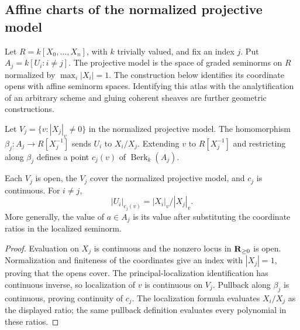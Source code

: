 \subsection{Affine charts of the normalized projective model}
\label{subsec:projective-charts}

Let $R=k[X_0,\ldots,X_n]$, with $k$ trivially valued, and fix an index $j$.
Put $A_j=k[U_i:i\ne j]$. The projective model is the space of graded
seminorms on $R$ normalized by $\max_i|X_i|=1$. The construction below
identifies its coordinate opens with affine seminorm spaces. Identifying this
atlas with the analytification of an arbitrary scheme and gluing coherent
sheaves are further geometric constructions.

\begin{definition}
\label{charts:ratio-map}
\leanok
{}
Let $V_j=\{v:|X_j|_v\ne0\}$ in the normalized projective model.
The homomorphism $\beta_j:A_j\to R[X_j^{-1}]$ sends $U_i$ to
$X_i/X_j$. Extending $v$ to $R[X_j^{-1}]$ and restricting along
$\beta_j$ defines a point $c_j(v)$ of $\operatorname{Berk}_k(A_j)$.
\end{definition}

\begin{lemma}
\label{charts:forward-chart}
\leanok
{}
Each $V_j$ is open, the $V_j$ cover the normalized projective model,
and $c_j$ is continuous. For $i\ne j$,
\[
 |U_i|_{c_j(v)}=|X_i|_v/|X_j|_v.
\]
More generally, the value of $a\in A_j$ is its value after substituting
the coordinate ratios in the localized seminorm.
\end{lemma}
\begin{proof}
Evaluation on $X_j$ is continuous and the nonzero locus in
$\mathbf{R}_{\ge0}$ is open. Normalization and finiteness of the coordinates
give an index with $|X_j|=1$, proving that the opens cover.
The principal-localization identification has continuous inverse,
so localization of $v$ is continuous on $V_j$. Pullback along
$\beta_j$ is continuous, proving continuity of $c_j$.
The localization formula evaluates $X_i/X_j$ as the displayed ratio;
the same pullback definition evaluates every polynomial in these ratios.
\end{proof}

